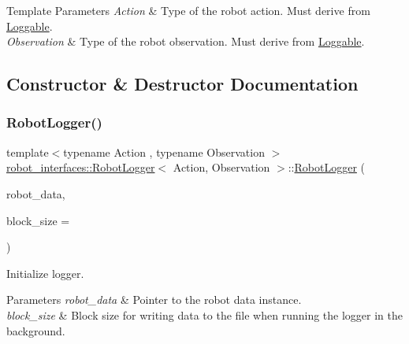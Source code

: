 \begin{DoxyTemplParams}{Template Parameters}
{\em Action} & Type of the robot action. Must derive from \hyperlink{classrobot__interfaces_1_1Loggable}{Loggable}. \\
\hline
{\em Observation} & Type of the robot observation. Must derive from \hyperlink{classrobot__interfaces_1_1Loggable}{Loggable}. \\
\hline
\end{DoxyTemplParams}


\subsection{Constructor \& Destructor Documentation}
\mbox{\label{classrobot__interfaces_1_1RobotLogger_aacc60628e6fd5ca26f15dfe51763697d}} 
\subsubsection{\texorpdfstring{Robot\+Logger()}{RobotLogger()}}
{\footnotesize\ttfamily template$<$typename Action , typename Observation $>$ \\
\hyperlink{classrobot__interfaces_1_1RobotLogger}{robot\+\_\+interfaces\+::\+Robot\+Logger}$<$ Action, Observation $>$\+::\hyperlink{classrobot__interfaces_1_1RobotLogger}{Robot\+Logger} (\begin{DoxyParamCaption}\item[{std\+::shared\+\_\+ptr$<$ \hyperlink{classrobot__interfaces_1_1RobotData}{robot\+\_\+interfaces\+::\+Robot\+Data}$<$ Action, Observation $>$$>$}]{robot\+\_\+data,  }\item[{int}]{block\+\_\+size = {} }\end{DoxyParamCaption})\hspace{0.3cm}{\ttfamily [inline]}}



Initialize logger. 


\begin{DoxyParams}{Parameters}
{\em robot\+\_\+data} & Pointer to the robot data instance. \\
\hline
{\em block\+\_\+size} & Block size for writing data to the file when running the logger in the background. \\
\hline
\end{DoxyParams}


